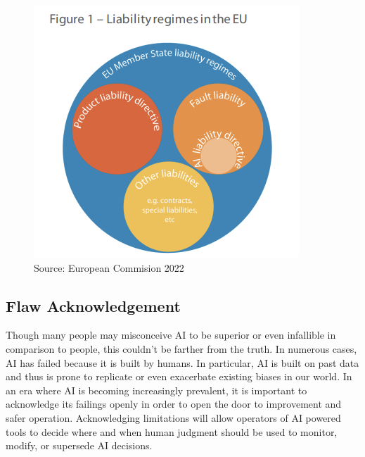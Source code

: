 \documentclass[10pt]{article}
\begin{document}
    \begin{figure}[H]
      \centering 
      \includegraphics[scale=0.4]{img/liability.png}
      \caption{Source: European Commision 2022} 
      \label{fig:liability}
    \end{figure}

  \subsection{Flaw Acknowledgement}

    Though many people may misconceive AI to be superior or even infallible in comparison to people, this couldn’t be farther from the truth. In numerous cases, AI has failed because it is built by humans. In particular, AI is built on past data and thus is prone to replicate or even exacerbate existing biases in our world. In an era where AI is becoming increasingly prevalent, it is important to acknowledge its failings openly in order to open the door to improvement and safer operation. Acknowledging limitations will allow operators of AI powered tools to decide where and when human judgment should be used to monitor, modify, or supersede AI decisions.
\end{document}
